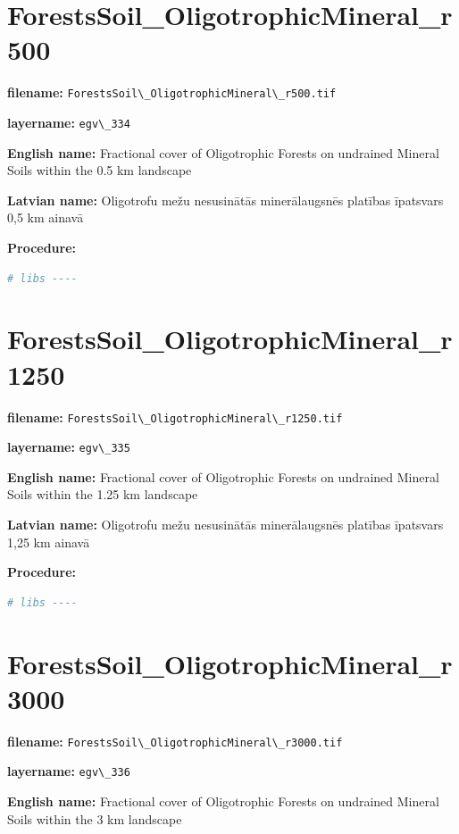 \documentclass[
]{book}
\newcommand{\passthrough}[1]{#1}
\begin{document}
\section{ForestsSoil\_OligotrophicMineral\_r500}\label{ch06.334}

\textbf{filename:} \passthrough{\lstinline!ForestsSoil\_OligotrophicMineral\_r500.tif!}

\textbf{layername:} \passthrough{\lstinline!egv\_334!}

\textbf{English name:} Fractional cover of Oligotrophic Forests on undrained Mineral Soils within the 0.5 km landscape

\textbf{Latvian name:} Oligotrofu mežu nesusinātās minerālaugsnēs platības īpatsvars 0,5 km ainavā

\textbf{Procedure:}

\begin{lstlisting}[language=R]
# libs ----
\end{lstlisting}

\section{ForestsSoil\_OligotrophicMineral\_r1250}\label{ch06.335}

\textbf{filename:} \passthrough{\lstinline!ForestsSoil\_OligotrophicMineral\_r1250.tif!}

\textbf{layername:} \passthrough{\lstinline!egv\_335!}

\textbf{English name:} Fractional cover of Oligotrophic Forests on undrained Mineral Soils within the 1.25 km landscape

\textbf{Latvian name:} Oligotrofu mežu nesusinātās minerālaugsnēs platības īpatsvars 1,25 km ainavā

\textbf{Procedure:}

\begin{lstlisting}[language=R]
# libs ----
\end{lstlisting}

\section{ForestsSoil\_OligotrophicMineral\_r3000}\label{ch06.336}

\textbf{filename:} \passthrough{\lstinline!ForestsSoil\_OligotrophicMineral\_r3000.tif!}

\textbf{layername:} \passthrough{\lstinline!egv\_336!}

\textbf{English name:} Fractional cover of Oligotrophic Forests on undrained Mineral Soils within the 3 km landscape
\end{document}
